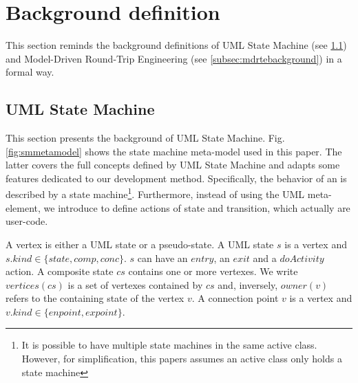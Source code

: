 \section{Background definition}
\label{sec:background}
This section reminds the background definitions of UML State Machine (see \ref{subsec:usmbackground}) and Model-Driven Round-Trip Engineering (see \ref{subsec:mdrtebackground}) in a formal way.


\subsection{UML State Machine}
\label{subsec:usmbackground}

This section presents the background of UML State Machine.
Fig. \ref{fig:smmetamodel} shows the state machine meta-model used in this paper.
The latter covers the full concepts defined by UML State Machine and adapts some features dedicated to our development method.
Specifically, the behavior of an  is described by a state machine\footnote{It is possible to have multiple state machines in the same active class. However, for simplification, this papers assumes an active class only holds a state machine}.
Furthermore, instead of using the  UML meta-element, we introduce  to define actions of state and transition, which actually are user-code.



\begin{definition} A vertex is either a UML state or a pseudo-state. 
	A UML state $s$ is a vertex and $s.kind \in \{state, comp, conc\}$. 
	$s$ can have an $entry$, an $exit$ and a $doActivity$ action. 
	A composite state $cs$ contains one or more vertexes. We write $vertices(cs)$ is a set of vertexes contained by $cs$ and, inversely, $owner(v)$ refers to the containing state of the vertex $v$. 
	A connection point $v$ is a vertex and $v.kind \in \{enpoint, expoint\}$.%
\end{definition}		

